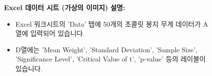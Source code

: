 \documentclass[11pt,a4paper]{book}
\providecommand{\captionof}[2]{\textbf{#2}}
\theoremstyle{definition}
\begin{document}
\begin{figure}[h!]
    \centering
    \captionof{figure}{Excel 데이터 시트 (가상의 이미지)}
    \label{fig:excel_data_sheet}
    \vspace{0.5em}
    \textbf{설명:}
    \begin{itemize}
        \item Excel 워크시트의 'Data' 탭에 50개의 초콜릿 봉지 무게 데이터가 A열에 입력되어 있습니다.
        \item D열에는 'Mean Weight', 'Standard Deviation', 'Sample Size', 'Significance Level', 'Critical Value of t', 'p-value' 등의 레이블이 있습니다.
    \end{itemize}
\end{figure}
\end{document}
